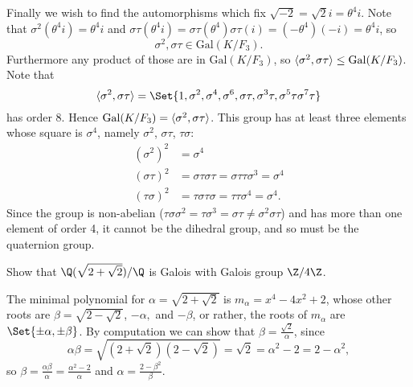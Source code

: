 \documentclass[a4paper, 11pt]{homework}
\newcommand{\Gal}{\mathrm{Gal}}
\newcommand{\gen}[1]{{\providecommand{\given}{}\renewcommand{\given}{\;\vert\;}\langle#1\rangle}}
\begin{document}
\begin{questions}
\begin{solution}
		Finally we wish to find the automorphisms which fix \(\sqrt{-2} = \sqrt2 i = \theta^4 i\). Note that
		\(\sigma^2(\theta^4i) = \theta^4i\) and \(\sigma\tau(\theta^4i) = \sigma\tau(\theta^4)\sigma\tau(i) =
		(-\theta^4)(-i) = \theta^4i\), so \[\sigma^2, \sigma\tau \in \Gal(K/F_3).\] Furthermore any product of
		those are in \(\Gal(K/F_3)\), so \(\gen{\sigma^2, \sigma\tau} \le \Gal(K/F_3)\). Note that
		\[
			\gen{\sigma^2,\sigma\tau} = \Set{1, \sigma^2, \sigma^4, \sigma^6, \sigma\tau, \sigma^3\tau, \sigma^5\tau
				\sigma^7\tau}
		\]
		has order 8. Hence \(\Gal(K/F_3) = \gen{\sigma^2, \sigma\tau}\). This group has at least three elements whose
		square is \(\sigma^4\),  namely \(\sigma^2\), \(\sigma\tau\), \(\tau\sigma\):
		\begin{align*}
			(\sigma^2)^2   & = \sigma^4                                                 \\
			(\sigma\tau)^2 & = \sigma\tau\sigma\tau = \sigma\tau\tau\sigma^3 = \sigma^4 \\
			(\tau\sigma)^2 & = \tau\sigma\tau\sigma = \tau\tau\sigma^4 = \sigma^4.
		\end{align*}
		Since the group is non-abelian (\(\tau\sigma \sigma^2 = \tau\sigma^3 = \sigma\tau \ne \sigma^2 \sigma\tau\))
		and has more than one element of order 4, it cannot be the dihedral group, and so must be the quaternion group.
	\end{solution}

	\question{} Show that \(\Q(\sqrt{2+\sqrt2})/\Q\) is Galois with Galois group \(\Z/4\Z\).
	\begin{solution}
		The minimal polynomial for \(\alpha = \sqrt{2+\sqrt2}\) is \(m_\alpha = x^4-4x^2+2\), whose other roots are
		\(\beta = \sqrt{2 - \sqrt2}\), \(-\alpha,\) and \(-\beta\), or rather, the roots of \(m_\alpha\) are \(\Set{
			\pm\alpha,\pm\beta}\). By computation we can show that \(\beta = \frac{\sqrt2}\alpha\), since
		\[
			\alpha\beta = \sqrt{(2+\sqrt2)(2-\sqrt2)} = \sqrt2 = \alpha^2 - 2 = 2 - \alpha^2,
		\]
		so \(\beta = \frac{\alpha\beta}{\alpha} = \frac{\alpha^2-2}{\alpha}\) and \(\alpha = \frac{2-\beta^2}{\beta}\).


\end{solution}
\end{questions}
\end{document}
